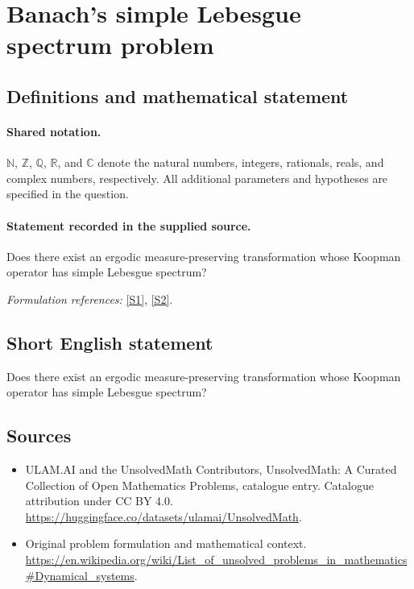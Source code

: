 \documentclass[11pt]{article}
\newcommand{\sref}[2]{\hyperlink{source:#1:#2}{[S#2]}}
\begin{document}
\section{Banach's simple Lebesgue spectrum problem}\label{statement}

\subsection{Definitions and mathematical statement}

\paragraph{Shared notation.}$\mathbb N$, $\mathbb Z$, $\mathbb Q$, $\mathbb R$, and $\mathbb C$ denote the natural numbers, integers, rationals, reals, and complex numbers, respectively. All additional parameters and hypotheses are specified in the question.


\paragraph{Statement recorded in the supplied source.}
Does there exist an ergodic measure-preserving transformation whose Koopman operator has simple Lebesgue spectrum?
\par\smallskip\textit{Formulation references:} \sref{statement}{1}, \sref{statement}{2}.
\subsection{Short English statement}
Does there exist an ergodic measure-preserving transformation whose Koopman operator has simple Lebesgue spectrum?
\subsection{Sources}
\begin{itemize}
\item[\hypertarget{source:statement:1}{S1}] ULAM.AI and the UnsolvedMath Contributors, UnsolvedMath: A Curated Collection of Open Mathematics Problems, catalogue entry. Catalogue attribution under CC BY 4.0.
\url{https://huggingface.co/datasets/ulamai/UnsolvedMath}.
\item[\hypertarget{source:statement:2}{S2}] Original problem formulation and mathematical context.
\url{https://en.wikipedia.org/wiki/List_of_unsolved_problems_in_mathematics#Dynamical_systems}.
\end{itemize}
\label{end:statement}
\end{document}
